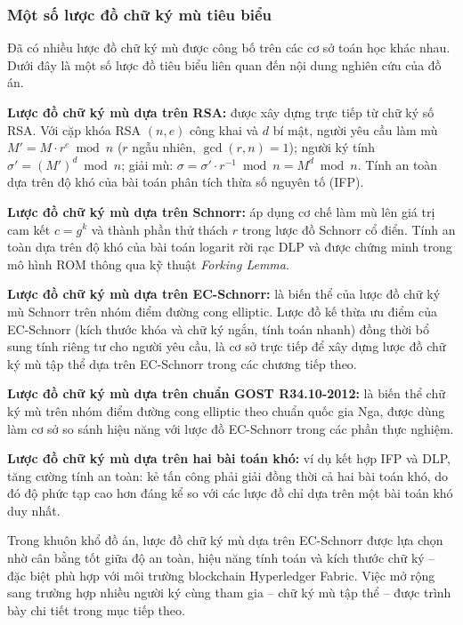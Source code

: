 \subsubsection{Một số lược đồ chữ ký mù tiêu biểu}

Đã có nhiều lược đồ chữ ký mù được công bố trên các cơ sở toán học khác nhau. Dưới đây là một số lược đồ tiêu biểu liên quan đến nội dung nghiên cứu của đồ án.

\textbf{Lược đồ chữ ký mù dựa trên RSA:} được xây dựng trực tiếp từ chữ ký số RSA. Với cặp khóa RSA $(n, e)$ công khai và $d$ bí mật, người yêu cầu làm mù $M' = M \cdot r^e \bmod n$ ($r$ ngẫu nhiên, $\gcd(r, n) = 1$); người ký tính $\sigma' = (M')^d \bmod n$; giải mù: $\sigma = \sigma' \cdot r^{-1} \bmod n = M^d \bmod n$. Tính an toàn dựa trên độ khó của bài toán phân tích thừa số nguyên tố (IFP).

\textbf{Lược đồ chữ ký mù dựa trên Schnorr:} áp dụng cơ chế làm mù lên giá trị cam kết $c = g^k$ và thành phần thử thách $r$ trong lược đồ Schnorr cổ điển. Tính an toàn dựa trên độ khó của bài toán logarit rời rạc DLP và được chứng minh trong mô hình ROM thông qua kỹ thuật \textit{Forking Lemma}.

\textbf{Lược đồ chữ ký mù dựa trên EC-Schnorr:} là biến thể của lược đồ chữ ký mù Schnorr trên nhóm điểm đường cong elliptic. Lược đồ kế thừa ưu điểm của EC-Schnorr (kích thước khóa và chữ ký ngắn, tính toán nhanh) đồng thời bổ sung tính riêng tư cho người yêu cầu, là cơ sở trực tiếp để xây dựng lược đồ chữ ký mù tập thể dựa trên EC-Schnorr trong các chương tiếp theo.

\textbf{Lược đồ chữ ký mù dựa trên chuẩn GOST R34.10-2012:} là biến thể chữ ký mù trên nhóm điểm đường cong elliptic theo chuẩn quốc gia Nga, được dùng làm cơ sở so sánh hiệu năng với lược đồ EC-Schnorr trong các phần thực nghiệm.

\textbf{Lược đồ chữ ký mù dựa trên hai bài toán khó:} ví dụ kết hợp IFP và DLP, tăng cường tính an toàn: kẻ tấn công phải giải đồng thời cả hai bài toán khó, do đó độ phức tạp cao hơn đáng kể so với các lược đồ chỉ dựa trên một bài toán khó duy nhất.

Trong khuôn khổ đồ án, lược đồ chữ ký mù dựa trên EC-Schnorr được lựa chọn nhờ cân bằng tốt giữa độ an toàn, hiệu năng tính toán và kích thước chữ ký -- đặc biệt phù hợp với môi trường blockchain Hyperledger Fabric. Việc mở rộng sang trường hợp nhiều người ký cùng tham gia -- chữ ký mù tập thể -- được trình bày chi tiết trong mục tiếp theo.
